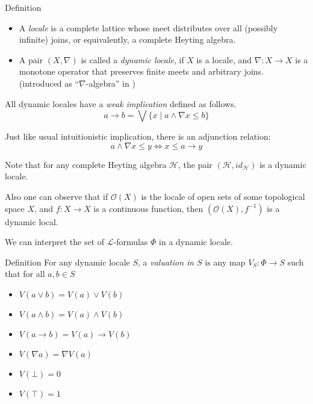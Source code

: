 \documentclass[handout]{beamer}
\begin{document}
\begin{frame}{\subAlgSemantics}
	\begin{block}{Definition}
		\begin{itemize}
			\item A \emph{locale} is a complete lattice whose meet distributes over all (possibly infinite) joins, or equivalently, a complete Heyting algebra.
			\item A pair $(X, \nabla)$ is called a \emph{dynamic locale}, if $X$ is a locale, and $\nabla : X \rightarrow X$ is a monotone operator that preserves finite meets and arbitrary joins.\\ {\footnotesize(introduced as ``$\nabla$-algebra'' in \cite{amir})}
		\end{itemize}
	\end{block}

	All dynamic locales have a \emph{weak implication} defined as follows. \[a \to b = \bigvee \{ x \mid a \wedge \nabla x \leq b \} \]
\end{frame}

\begin{frame}{\subAlgSemantics}
	Just like usual intuitionistic implication, there is an adjunction relation:
	\[ a \wedge \nabla x \leq y \iff x \leq a \to y \]

	Note that for any complete Heyting algebra $\mathcal{H}$, the pair $(\mathcal{H}, id_\mathcal{H})$ is a dynamic locale.
	
	Also one can observe that if $\mathcal{O}(X)$ is the locale of open sets of some topological space $X$, and $f : X \to X$ is a continuous function, then $(\mathcal{O}(X), f^{-1})$ is a dynamic local.
\end{frame}


\begin{frame}{\subAlgSemantics}
	We can interpret the set of $\mathcal{L}$-formulas $\Phi$ in a dynamic locale.

	\begin{block}{Definition}
		For any dynamic locale $S$, a \emph{valuation in $S$} is any map $V_S : \Phi \to S$ such that for all $a, b \in S$
		\begin{itemize}
			\item $V(a \vee b) = V(a) \vee V(b)$
			\item $V(a \wedge b) = V(a) \wedge V(b)$
			\item $V(a \to b) = V(a) \to V(b)$
			\item $V(\nabla a) = \nabla V(a)$
			\item $V(\bot) = 0$
			\item $V(\top) = 1$
		\end{itemize}
	\end{block}
\end{frame}
\end{document}
